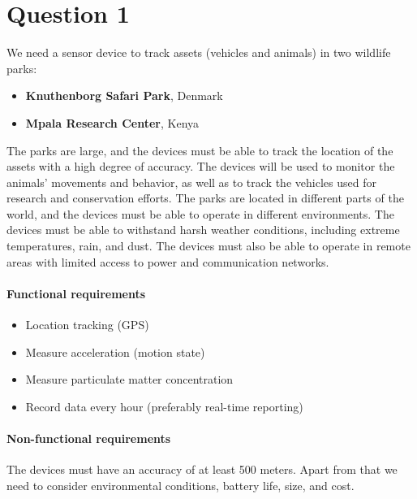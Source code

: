 \chapter*{Question 1}

We need a sensor device to track assets (vehicles and animals) in two wildlife parks:

\begin{itemize}
  \item \textbf{Knuthenborg Safari Park}, Denmark
  \item \textbf{Mpala Research Center}, Kenya
\end{itemize}

The parks are large, and the devices must be able to track the location of the assets with a high degree of accuracy. The devices will be used to monitor the animals' movements and behavior, as well as to track the vehicles used for research and conservation efforts.
The parks are located in different parts of the world, and the devices must be able to operate in different environments. The devices must be able to withstand harsh weather conditions, including extreme temperatures, rain, and dust. The devices must also be able to operate in remote areas with limited access to power and communication networks.

\subsubsection{Functional requirements}

\begin{itemize}
  \item Location tracking (GPS)
  \item Measure acceleration (motion state)
  \item Measure particulate matter concentration
  \item Record data every hour (preferably real-time reporting)
\end{itemize}

\subsubsection{Non-functional requirements}
The devices must have an accuracy of at least 500 meters. Apart from that we need to consider environmental conditions, battery life, size, and cost.

